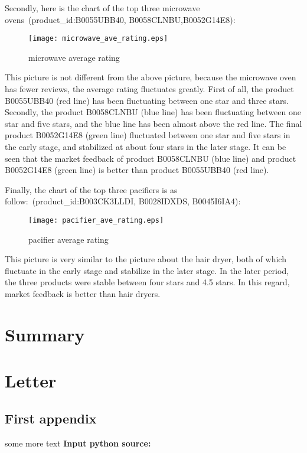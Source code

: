 \documentclass{mcmthesis}
\begin{document}
Secondly, here is the chart of the top three microwave ovens\    (product\_id:B0055UBB40, B0058CLNBU,B0052G14E8):

\begin{figure}[H]
	\small
	\centering
	\texttt{[image: microwave\_ave\_rating.eps]}
	\caption{microwave average rating} \label{fig:micorwave average rating}
\end{figure}

This picture is not different from the above picture, because the microwave oven has fewer reviews, the average rating fluctuates greatly. First of all, the product B0055UBB40 (red line) has been fluctuating between one star and three stars. Secondly, the product B0058CLNBU (blue line) has been fluctuating between one star and five stars, and the blue line has been almost above the red line. The final product B0052G14E8 (green line) fluctuated between one star and five stars in the early stage, and stabilized at about four stars in the later stage. It can be seen that the market feedback of product B0058CLNBU (blue line) and product B0052G14E8 (green line) is better than product B0055UBB40 (red line).

Finally, the chart of the top three pacifiers is as follow:\ (product\_id:B003CK3LLDI, B0028IDXDS, B0045I6IA4):
\begin{figure}[H]
	\small
	\centering
	\texttt{[image: pacifier\_ave\_rating.eps]}
	\caption{pacifier average rating} \label{fig:pacifier average rating}
\end{figure}
This picture is very similar to the picture about the hair dryer, both of which fluctuate in the early stage and stabilize in the later stage. In the later period, the three products were stable between four stars and 4.5 stars. In this regard, market feedback is better than hair dryers.




\section{Summary}


\section{Letter}


\begin{thebibliography}{99}
\end{thebibliography}

\begin{appendices}
	
	\section{First appendix}
	
	
	some more text \textcolor[rgb]{0.98,0.00,0.00}{\textbf{Input python source:}}
	
	
\end{appendices}
\end{document}
